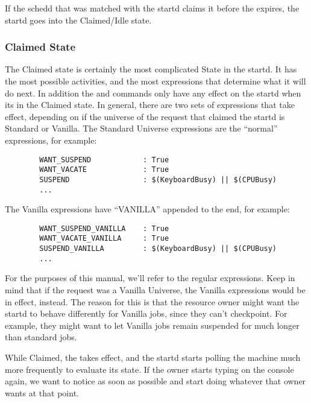 If the schedd that was matched with the startd claims it before the
 expires, the startd goes into the Claimed/Idle
state.

\subsubsection{Claimed State}
\label{sec:Claimed-State}

The Claimed state is certainly the most complicated State in the
startd.  It has the most possible activities, and the most expressions
that determine what it will do next.  In addition the
 and  commands only have any effect
on the startd when its in the Claimed state.  In general, there are
two sets of expressions that take effect, depending on if the universe
of the request that claimed the startd is Standard or Vanilla.  The
Standard Universe expressions are the ``normal'' expressions, for
example:

\begin{verbatim}
        WANT_SUSPEND            : True
        WANT_VACATE             : True
        SUSPEND                 : $(KeyboardBusy) || $(CPUBusy)
        ...
\end{verbatim}

The Vanilla expressions have ``VANILLA'' appended to the end, for
example:

\begin{verbatim}
        WANT_SUSPEND_VANILLA    : True
        WANT_VACATE_VANILLA     : True
        SUSPEND_VANILLA         : $(KeyboardBusy) || $(CPUBusy)
        ...
\end{verbatim}

For the purposes of this manual, we'll refer to the regular
expressions.  Keep in mind that if the request was a Vanilla Universe,
the Vanilla expressions would be in effect, instead.  The reason for
this is that the resource owner might want the startd to behave
differently for Vanilla jobs, since they can't checkpoint.  For
example, they might want to let Vanilla jobs remain suspended for much
longer than standard jobs.

While Claimed, the  takes effect, and the
startd starts polling the machine much more frequently to evaluate its
state.  If the owner starts typing on the console again, we want to
notice as soon as possible and start doing whatever that owner wants
at that point.  

